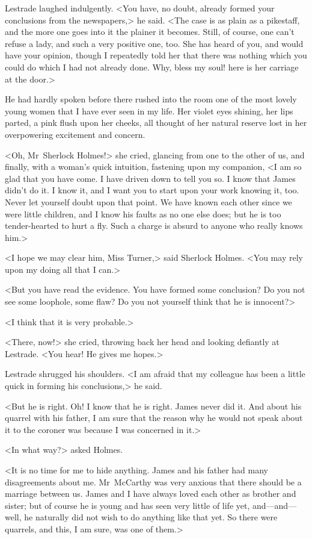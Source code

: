 Lestrade laughed indulgently. <You have, no doubt, already formed your conclusions from the newspapers,> he said. <The case is as plain as a pikestaff, and the more one goes into it the plainer it becomes. Still, of course, one can't refuse a lady, and such a very positive one, too. She has heard of you, and would have your opinion, though I repeatedly told her that there was nothing which you could do which I had not already done. Why, bless my soul! here is her carriage at the door.>

He had hardly spoken before there rushed into the room one of the most lovely young women that I have ever seen in my life. Her violet eyes shining, her lips parted, a pink flush upon her cheeks, all thought of her natural reserve lost in her overpowering excitement and concern.

<Oh, Mr~Sherlock Holmes!> she cried, glancing from one to the other of us, and finally, with a woman's quick intuition, fastening upon my companion, <I am so glad that you have come. I have driven down to tell you so. I know that James didn't do it. I know it, and I want you to start upon your work knowing it, too. Never let yourself doubt upon that point. We have known each other since we were little children, and I know his faults as no one else does; but he is too tender-hearted to hurt a fly. Such a charge is absurd to anyone who really knows him.>

<I hope we may clear him, Miss Turner,> said Sherlock Holmes. <You may rely upon my doing all that I can.>

<But you have read the evidence. You have formed some conclusion? Do you not see some loophole, some flaw? Do you not yourself think that he is innocent?>

<I think that it is very probable.>

<There, now!> she cried, throwing back her head and looking defiantly at Lestrade. <You hear! He gives me hopes.>

Lestrade shrugged his shoulders. <I am afraid that my colleague has been a little quick in forming his conclusions,> he said.

<But he is right. Oh! I know that he is right. James never did it. And about his quarrel with his father, I am sure that the reason why he would not speak about it to the coroner was because I was concerned in it.>

<In what way?> asked Holmes.

<It is no time for me to hide anything. James and his father had many disagreements about me. Mr~McCarthy was very anxious that there should be a marriage between us. James and I have always loved each other as brother and sister; but of course he is young and has seen very little of life yet, and—and—well, he naturally did not wish to do anything like that yet. So there were quarrels, and this, I am sure, was one of them.>

